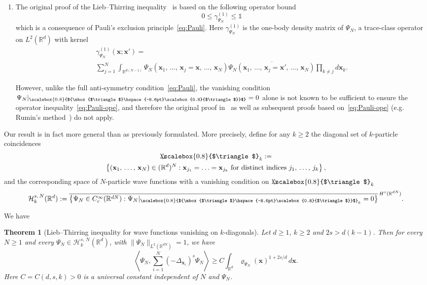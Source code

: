 \documentclass[10pt]{amsart}
\newtheorem{theo}{Theorem}[section]
\theoremstyle{definition}\newtheorem{defi}[theo]{Definition}\newtheorem{rema}[theo]{Remark}\newtheorem{exam}[theo]{Example}\newtheorem{exem}[theo]{Example}\newtheorem{nota}[theo]{Notation}
\newcommand*\R {\mathbb{R}}
\newcommand\1{{\ensuremath {\mathds 1} }}
\newcommand{\bx}{\mathbf{x}}
\newcommand{\cH}{\mathcal{H}}
\newcommand{\bDelta}{{\mbox{$\triangle$}\hspace{-8.6pt}\scalebox{0.8}{$\triangle$}}}
\newcommand{\scriptbDelta}{\scalebox{0.8}{$\bDelta$}}
\begin{document}
\begin{enumerate}
\item The original proof of the Lieb--Thirring inequality~\cite{LieThi-75,LieThi-76} is based on the following operator bound
\begin{equation}\label{eq:Pauli-ope}
0\le \gamma_{\Psi_N}^{(1)}\le \1
\end{equation}
which is a consequence of Pauli's exclusion principle~\eqref{eq:Pauli}. Here $\gamma_{\Psi_N}^{(1)}$ is the one-body density matrix of $\Psi_N$, a trace-class operator on $L^2(\R^d)$ with kernel
\begin{multline*}
\gamma_{\Psi_N}^{(1)}(\bx;\bx')=\\
\sum_{j=1}^N \int_{\R^{d(N-1)}} \Psi_N(\bx_1,\,\ldots,\,\bx_j=\bx,\,\ldots,\,\bx_N) \overline{\Psi_N(\bx_1,\,\ldots,\,\bx_j=\bx',\,\ldots,\,\bx_N)} \prod_{k\neq j} d\bx_k.
\end{multline*}

However, unlike the full anti-symmetry condition~\eqref{eq:Pauli}, the vanishing condition $\Psi_N\rvert_{\scriptbDelta}=0$ alone is not known to be sufficient to ensure the operator inequality~\eqref{eq:Pauli-ope}, and therefore the original proof in~\cite{LieThi-75,LieThi-76} as well as subsequent proofs based on~\eqref{eq:Pauli-ope} (e.g. Rumin's method~\cite{Rumin-11}) do not apply.
\end{enumerate}

Our result is in fact more general than as previously formulated. More precisely, define for any $k \ge 2$ the diagonal set of $k$-particle coincidences
\begin{multline}\label{eq:k-diagonal}
\bDelta_k :=\\
\left\{(\bx_1,\,\ldots,\,\bx_N) \in (\R^d)^{N}: \bx_{j_1}= \ldots = \bx_{j_k} \text{ for distinct indices } j_1,\,\ldots,\,j_k \right\},
\end{multline}
and the corresponding space of $N$-particle wave functions with a vanishing condition on $\bDelta_k$
\[
\cH^{s,\,N}_k(\R^d) := \overline{\left\{\Psi_N \in C_c^\infty(\R^{dN}): \Psi_N\rvert_{\scriptbDelta_k}=0 \right\}}^{\, H^s(\R^{dN})}.
\]

\goodbreak
We have

\begin{theo}[Lieb--Thirring inequality for wave functions vanishing on $k$-diago\-nals] \label{thm:main-general}
Let $d\ge 1$, $k \ge 2$ and $2s>d(k-1)$. Then for every $N \ge 1$ and every $\Psi_N \in\cH^{s,\,N}_k(\R^d)$, with $\|\Psi_N\|_{L^2(\R^{dN})}=1$, we have
\begin{equation}\label{eq:LT-diagonal-general}
\left\langle \Psi_N, \sum_{i=1}^N (-\Delta_{\bx_i})^s\Psi_N \right\rangle
\ge C\int_{\R^d} \varrho_{\Psi_N}(\bx)^{1+2s/d} \,d\bx.
\end{equation}
Here $C=C(d,s,k)>0$ is a universal constant independent of $N$ and $\Psi_N$.
\end{theo}
\end{document}
